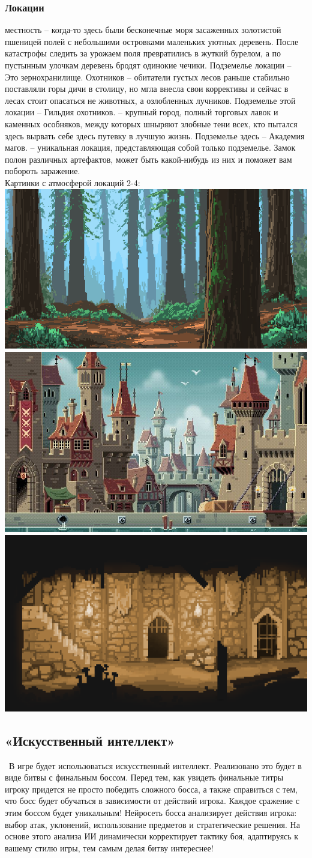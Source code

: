 \documentclass{article}
\begin{document}
\subsubsection{Локации}
\begin{itemize}
 местность – когда-то здесь были бесконечные моря засаженных золотистой пшеницей полей с небольшими островками маленьких уютных деревень. После катастрофы следить за урожаем поля превратились в жуткий бурелом, а по пустынным улочкам деревень бродят одинокие чечики. Подземелье локации – Это зернохранилище.
 Охотников – обитатели густых лесов раньше стабильно поставляли горы дичи в столицу, но мгла внесла свои коррективы и сейчас в лесах стоит опасаться не животных, а озлобленных лучников. Подземелье этой локации – Гильдия охотников.
 – крупный город, полный торговых лавок и каменных особняков, между которых шныряют злобные тени всех, кто пытался здесь вырвать себе здесь путевку в лучшую жизнь. Подземелье здесь – Академия магов.
 – уникальная локация, представляющая собой только подземелье. Замок полон различных артефактов, может быть какой-нибудь из них и поможет вам побороть заражение.\\
Картинки с атмосферой  локаций 2-4:\\
\includegraphics[width=0.3\linewidth]{images/dd_les.png}\hspace{0.5cm}\includegraphics[width=0.3\linewidth]{images/dd_stolica.jpg}\hspace{0.5cm}\includegraphics[width=0.3\linewidth]{images/dd_zamok.png}
\end{itemize}
\subsection{«Искусственный интеллект»}
\
В игре будет использоваться искусственный интеллект. Реализовано это будет в виде битвы с финальным боссом. Перед тем, как увидеть финальные титры игроку придется не просто победить сложного босса, а также справиться с тем, что босс будет обучаться в зависимости от действий игрока. Каждое сражение с этим боссом будет уникальным! Нейросеть босса анализирует действия игрока: выбор атак, уклонений, использование предметов и стратегические решения. На основе этого анализа ИИ динамически корректирует тактику боя, адаптируясь к вашему стилю игры, тем самым делая битву интереснее! 
\end{document}
